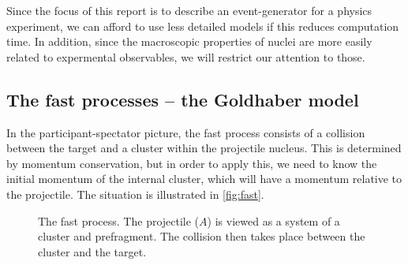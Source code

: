 Since the focus of this report is to describe an event-generator for a physics experiment, we can afford to use less detailed models if this reduces computation time. In addition, since the macroscopic properties of nuclei are more easily related to expermental observables, we will restrict our attention to those. 

\subsection{The fast processes -- the Goldhaber model}
\label{sec:fast}
In the participant-spectator picture, the fast process consists of a collision between the target and a cluster within the projectile nucleus. This is determined by momentum conservation, but in order to apply this, we need to know the initial momentum of the internal cluster, which will have a momentum relative to the projectile. The situation is illustrated in \autoref{fig:fast}. 

\begin{figure}
\centering

\caption{\label{fig:fast} The fast process. The projectile ($A$) is viewed as a system of a cluster and prefragment. The collision then takes place between the cluster and the target.}
\end{figure}

